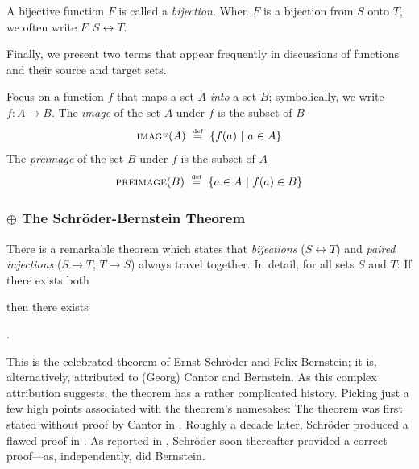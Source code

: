 \begin{enumerate}
A bijective function $F$ is called a {\it bijection}.  When $F$ is a bijection from $S$ onto $T$, we often write $F: S \leftrightarrow T$.
\end{enumerate}

\medskip

Finally, we present two terms that appear frequently in discussions of functions and their source and target sets.

\smallskip

 
Focus on a function $f$ that maps a set $A$ {\em into} a set $B$; symbolically, we write $f: A \rightarrow B$.  The {\it image} of the set $A$ under $f$ is the subset of $B$
\[  \mbox{\sc image}(A) \ \stackrel{\mbox{{\tiny def}}}{=} \  \{f(a) \ | \ a \in A\} \]
The {\it preimage} of the set $B$ under $f$ is the subset of $A$
\[  \mbox{\sc preimage}(B) \ \stackrel{\mbox{{\tiny def}}}{=} \  \{a \in A \ | \ f(a) \in B\} \]


\subsubsection{$\oplus$ The Schr\"{o}der-Bernstein Theorem}
\label{sec:schroeder-bernstein}

There is a remarkable theorem which states that {\em bijections} ($S \leftrightarrow T$) and {\em paired injections} ($S \rightarrow T$, $T \rightarrow S$) always travel together.  In detail, for all sets $S$ and $T$: If there exists both

\hspace*{.2in}{\em an injection from $S$ to $T$ and an injection from $T$ to $S$}

\noindent then there exists

\hspace*{.2in}{\em a bijection between $S$ and $T$}.


\noindent
This is the celebrated theorem of Ernst Schr\"{o}der and Felix Bernstein; it is, alternatively, attributed to (Georg) Cantor and Bernstein.  As this complex attribution suggests, the theorem has a rather complicated history.  Picking just a few high points associated with the theorem's namesakes: The theorem was first stated without proof by Cantor in \cite{Cantor87}.  Roughly a decade later, Schr\"{o}der produced a flawed proof in \cite{Schroeder98a}.  As reported in \cite{Deiser2010}, Schr\"{o}der soon thereafter provided a correct proof---as, independently, did Bernstein.

